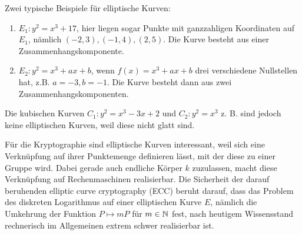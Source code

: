 Zwei typische Beispiele für elliptische Kurven: 
\begin{enumerate}[1)]
	\item $E_1\colon y^2 = x^3 + 17$, hier liegen sogar Punkte mit ganzzahligen Koordinaten auf $E_1$, nämlich $(-2,3), (-1,4), (2,5)$. Die Kurve besteht aus einer Zusammenhangskomponente.
	\item $E_2 \colon y^2 = x^3 + ax + b$, wenn $f(x) = x^3 + ax + b$ drei verschiedene Nullstellen hat, z.B. $a = -3, b= -1$. Die Kurve besteht dann aus zwei Zusammenhangskomponenten.
\end{enumerate}

	Die kubischen Kurven $C_1\colon y^2 = x^3 - 3x +2$ und $C_2\colon y^2 = x^3$ z. B. sind jedoch keine elliptischen Kurven, weil diese nicht glatt sind. 
	
Für die Kryptographie sind elliptische Kurven interessant, weil sich eine Verknüpfung auf ihrer Punktemenge definieren lässt, mit der diese zu einer Gruppe wird. Dabei gerade auch endliche Körper $k$ zuzulassen, macht diese Verknüpfung auf Rechenmaschinen realisierbar. Die Sicherheit der darauf beruhenden elliptic curve cryptography (ECC) beruht darauf, dass das Problem des diskreten Logarithmus auf einer elliptischen Kurve $E$, nämlich die Umkehrung der Funktion $P \mapsto mP$ für $m \in \mathbb{N}$ fest, nach heutigem Wissensstand rechnerisch im Allgemeinen extrem schwer realisierbar ist.
\newpage